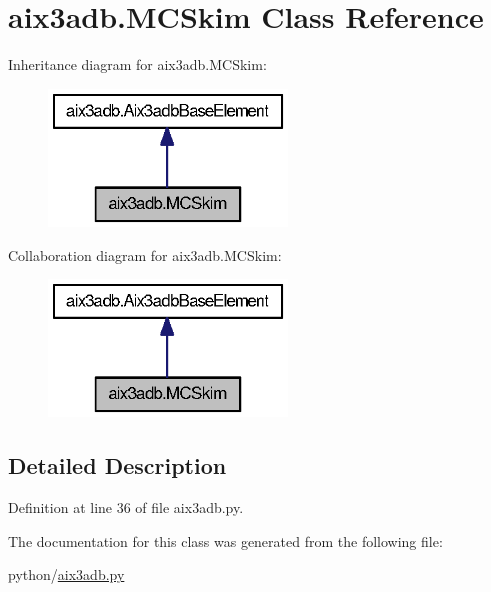 \section{aix3adb.\-M\-C\-Skim Class Reference}
\label{classaix3adb_1_1MCSkim}


Inheritance diagram for aix3adb.\-M\-C\-Skim\-:
\nopagebreak
\begin{figure}[H]
\begin{center}
\leavevmode
\includegraphics[width=180pt]{classaix3adb_1_1MCSkim__inherit__graph}
\end{center}
\end{figure}


Collaboration diagram for aix3adb.\-M\-C\-Skim\-:
\nopagebreak
\begin{figure}[H]
\begin{center}
\leavevmode
\includegraphics[width=180pt]{classaix3adb_1_1MCSkim__coll__graph}
\end{center}
\end{figure}


\subsection{Detailed Description}


Definition at line 36 of file aix3adb.\-py.



The documentation for this class was generated from the following file\-:\begin{DoxyCompactItemize}
\item 
python/\hyperlink{aix3adb_8py}{aix3adb.\-py}\end{DoxyCompactItemize}
